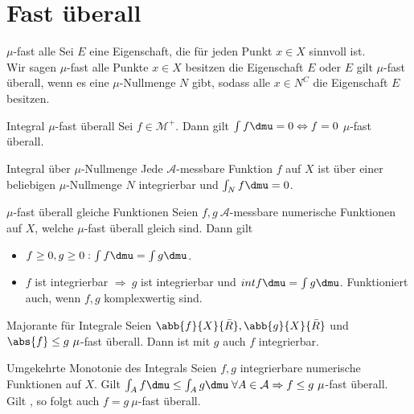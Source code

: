 \section{Fast überall}

\begin{karte}{\(\mu\)-fast alle}
	Sei \(E\) eine Eigenschaft, die für jeden Punkt \(x\in X\) sinnvoll ist.\\
	Wir sagen \( \mu \)-fast alle Punkte \(x\in X\) besitzen die Eigenschaft \(E\) 
	oder \(E\) gilt \(\mu\)-fast überall, wenn es eine \(\mu\)-Nullmenge \(N\) gibt, 
	sodass alle \(x \in N^C\) die Eigenschaft \(E\) besitzen.
\end{karte}

\begin{karte}{Integral \(\mu\)-fast überall}
	Sei \(f \in \mathcal{M}^+\). Dann gilt \( \int f \dmu = 0 \Leftrightarrow f = 0 \) \(\mu\)-fast überall.
\end{karte}

\begin{karte}{Integral über \(\mu\)-Nullmenge}
	Jede \(\mathcal{A}\)-messbare Funktion \(f\) auf \(X\) ist 
	über einer beliebigen \( \mu \)-Nullmenge \(N\) 
	integrierbar und \( \int_N f \dmu = 0 \).
\end{karte}

\begin{karte}{\(\mu\)-fast überall gleiche Funktionen}
	Seien \( f,g\ \mathcal{A} \)-messbare numerische Funktionen 
	auf \(X\), welche \(\mu\)-fast überall gleich sind.
	Dann gilt 
	\begin{itemize}
		\item \( f \geq 0, g\geq 0 : \int f \dmu = \int g \dmu \).
		\item \(f\) ist integrierbar \( \Rightarrow\ g \) ist integrierbar und \( int f \dmu = \int g \dmu \). Funktioniert auch, wenn \(f,g\) komplexwertig sind.
	\end{itemize}
\end{karte}

\begin{karte}{Majorante für Integrale}
	Seien \( \abb{f}{X}{\bar{R}}, \abb{g}{X}{\bar{R}} \) 
	und \(\abs{f} \leq g \ \mu\)-fast überall. 
	Dann ist mit \(g\) auch \(f\) integrierbar.
\end{karte}

\begin{karte}{Umgekehrte Monotonie des Integrals}
	Seien \( f,g \) integrierbare numerische Funktionen auf \(X\). 
	Gilt \( \int_A f\dmu \leq \int_A g \dmu \;\forall A\in \mathcal{A} \Rightarrow f \leq g \ \mu \)-fast überall.\\
	Gilt \gqq{\(=\)}, so folgt auch \(f = g\ \mu\)-fast überall.
\end{karte}